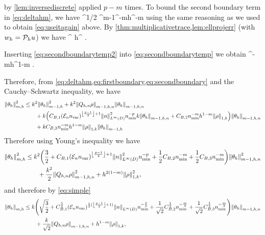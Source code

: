 by \cref{lem:inversediscrete} applied $p-m$ times.
To bound the second boundary term in \cref{eq:deltahm}, we have
\beq\label{eq:secondboundarytemp}
 \leq \CMT \CinvVhp^{1/2} \Chinv^{m-1}\nmin^{-m}h^{\half-m}\NLtGI{\rho}
\eeq
using the same reasoning as we used to obtain \cref{eq:useitagain} above. By \cref{thm:multiplicativetrace,lem:ellprojerr} (with $w_{h} = \mathcal P_{h} u$) we have
\beq\label{eq:secondboundarytemp2}
\NLtGI{\rho} \leq \CMT {}^{\half} h^{\half} \NW{\rho}.
\eeq

Inserting \cref{eq:secondboundarytemp2} into \cref{eq:secondboundarytemp} we obtain
\beq\label{eq:secondboundary}
 \leq \CBth \nmin^{-m}h^{1-m} \NW{\rho} .
\eeq

Therefore, from \cref{eq:deltahm,eq:firstboundary,eq:secondboundary} and the Cauchy--Schwartz inequality, we have
\begin{align*}
\Nfn{m,h}{\thetah}^2 &\leq k^2 \Nfn{m-1,h}{\thetah}^2 + k^2 \Nfn{m-1,h,n}{\Qhn \rho}\Nfn{m-1,h,n}{\thetah}\nonumber\\
&\quad\quad+ k\mleft(\CBo \mleft(\En\nvar\mright)^{\floor{\frac{p-1}2}+1}\NLiD{n}^2\nmin^{-p}k \Nfn{m-1,h,n}{\thetah} + \CBt \nmin^{-m}h^{1-m} \NW{\rho}\mright)\Nfn{m-1,h,n}{\thetah}\nonumber\\
&\quad\quad+ k\CBth \nmin^{-m}h^{1-m} \NW{\rho} \Nfn{m-1,h}{\thetah}%
\end{align*}
Therefore using Young's inequality we have
\begin{align*}
\Nfn{m,h}{\thetah}^2 &\leq k^2\mleft(\frac32 + \CBo \mleft(\En\nvar\mright)^{\floor{\frac{p-1}2}+1}\NLiD{n}^2\nmin^{-p} + \half \CBt \nmin^{-m} + \half\CBth \nmin^{-m}\mright)\Nfn{m-1,h,n}{\thetah}^2\\
&\quad\quad+ \frac{k^2}2 \Nfn{m-1,h,n}{\Qhn \rho}^2 +  h^{2(1-m)} \NW{\rho}^2,
\end{align*}
and therefore by \cref{eq:simple}
\begin{align}
\Nfn{m,h}{\thetah} &\leq k\mleft(\sqrt{\frac32} + \CBo^{\half} \mleft(\En\nvar\mright)^{\half(\floor{\frac{p-1}2}+1)}\NLiD{n}\nmin^{-\frac{p}2} + \frac1{\sqrt{2}} \CBt^{\half} \nmin^{-\frac{m}2} + \frac1{\sqrt{2}}\CBth^{\half} \nmin^{-\frac{m}2}\mright)\Nfn{m-1,h,n}{\thetah}\nonumber\\
&\quad\quad+ \frac{k}{\sqrt{2}} \Nfn{m-1,h,n}{\Qhn \rho} +  h^{1-m} \NW{\rho},\label{eq:thetahighnearly}
\end{align}

